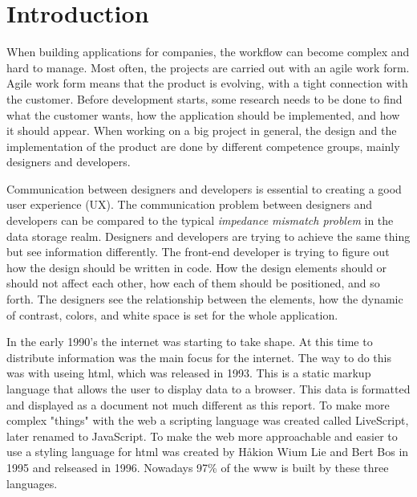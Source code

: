 \section{Introduction}



When building applications for companies, the workflow can become complex and hard to manage. Most often, the projects are carried out with an agile work form\cite{cohen2004introduction}. Agile work form means that the product is evolving, with a tight connection with the customer. Before development starts, some research needs to be done to find what the customer wants, how the application should be implemented, and how it should appear. When working on a big project in general, the design and the implementation of the product are done by different competence groups, mainly designers and developers. 

Communication between designers and developers is essential to creating a good user experience (UX). The communication problem between designers and developers can be compared to the typical \textit{impedance mismatch problem} in the data storage realm. Designers and developers are trying to achieve the same thing but see information differently. The front-end developer is trying to figure out how the design should be written in code. How the design elements should or should not affect each other, how each of them should be positioned, and so forth. The designers see the relationship between the elements, how the dynamic of contrast, colors, and white space is set for the whole application. 

In the early 1990's the internet was starting to take shape\cite{WebD2BriefHistory}. At this time to distribute information was the main focus for the internet. The way to do this was with useing \acrfull{html}, which was released in 1993\cite{WebD2BriefHistory}. This is a static markup language that allows the user to display data to a browser. This data is formatted and displayed as a document not much different as this report. To make more complex "things" with the web a scripting language was created called LiveScript, later renamed to JavaScript\cite{JavaScript2021}. To make the web more approachable and easier to use a styling language for \acrshort{html} was created by Håkion Wium Lie and Bert Bos in 1995 and relseased in 1996\cite{BriefHistoryCSS}. Nowadays 97\% of the \acrlong{www} is built by these three languages\cite{JavaScript2021}.


